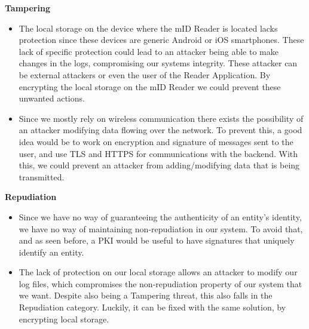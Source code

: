\textbf{Tampering}
\begin{itemize}
    \item The local storage on the device where the mID Reader is located lacks protection since these devices are generic Android or iOS smartphones. These lack of specific protection could lead to an attacker being able to make changes in the logs, compromising our systems integrity. These attacker can be external attackers or even the user of the Reader Application. By encrypting the local storage on the mID Reader we could prevent these unwanted actions.
    \item Since we mostly rely on wireless communication there exists the possibility of an attacker modifying data flowing over the network. To prevent this, a good idea would be to work on encryption and signature of messages sent to the user, and use TLS\cite{tls} and HTTPS for communications with the backend. With this, we could prevent an attacker from adding/modifying data that is being transmitted.
\end{itemize}

\textbf{Repudiation}
\begin{itemize}
    \item Since we have no way of guaranteeing the authenticity of an entity's identity, we have no way of maintaining non-repudiation in our system. To avoid that, and as seen before, a PKI\cite{pki} would be useful to have signatures that uniquely identify an entity.
    \item The lack of protection on our local storage allows an attacker to modify our log files, which compromises the non-repudiation property of our system that we want. Despite also being a Tampering threat, this also falls in the Repudiation category. Luckily, it can be fixed with the same solution, by encrypting local storage.
\end{itemize}

\newpage

